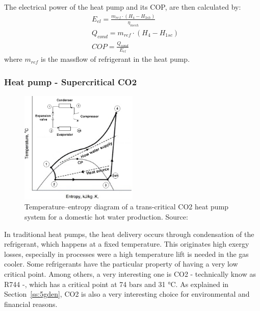 \documentclass{article}
\begin{document}
The electrical power of the heat pump and its COP, are then calculated by:
\begin{align}
	& E_{el} = \frac{m_{ref} \cdot (H_{4}-H_{3sh})}{\eta_{mech}}\\
	& Q_{cond} = m_{ref} \cdot (H_{4}-H_{1sc})\\
	& COP = \frac{Q_{cond}}{E_{el}}
\end{align}
where $m_{ref}$ is the massflow of refrigerant in the heat pump.


\subsubsection{Heat pump - Supercritical CO2}\label{sss:hp_CO2}

\begin{figure}[htp]
	\centering
	\includegraphics[width=0.5\textwidth]{HP_cylce_CO2.png}
	\caption{Temperature–entropy diagram of a trans-critical CO2 heat pump system for a domestic hot water production. Source:~\cite{kimPerformanceTranscriticalCO22005}}
	\label{fig:hp_CO2}
\end{figure}

In traditional heat pumps, the heat delivery occurs through condensation of the refrigerant, which happens at a fixed temperature. This originates high exergy losses, especially in processes were a high temperature lift is needed in the gas cooler. Some refrigerants have the particular property of having a very low critical point. Among others, a very interesting one is CO2 - technically know as R744 -, which has a critical point at 74 bars and 31 \si{\celsius}\cite{cavalliniPropertiesCO2Refrigerant2004}. As explained in Section~\ref{ss:5gden}, CO2 is also a very interesting choice for environmental and financial reasons.\\
\end{document}
